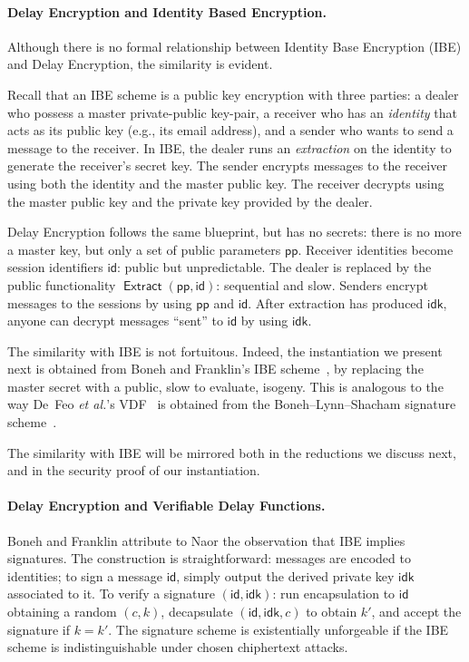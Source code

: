 \documentclass{llncs}
\DeclareMathOperator{\Extract}{\mathsf{Extract}}
\newcommand{\pp}{\mathsf{pp}}
\newcommand{\id}{\mathsf{id}}
\newcommand{\idk}{\mathsf{idk}}
\begin{document}
\paragraph{Delay Encryption and Identity Based Encryption.}
Although there is no formal relationship between Identity Base
Encryption (IBE) and Delay Encryption, the similarity is evident. 

Recall that an IBE scheme is a public key encryption with three
parties: a dealer who possess a master private-public key-pair, a
receiver who has an \emph{identity} that acts as its public key (e.g.,
its email address), and a sender who wants to send a message to the
receiver. %
In IBE, the dealer runs an \emph{extraction} on the identity to
generate the receiver's secret key. %
The sender encrypts messages to the receiver using both the identity
and the master public key. %
The receiver decrypts using the master public key and the private key
provided by the dealer.

Delay Encryption follows the same blueprint, but has no secrets: there
is no more a master key, but only a set of public parameters $\pp$. %
Receiver identities become session identifiers $\id$: public but
unpredictable. %
The dealer is replaced by the public functionality
$\Extract(\pp,\id)$: sequential and slow. %
Senders encrypt messages to the sessions by using $\pp$ and $\id$. %
After extraction has produced $\idk$, anyone can decrypt messages
``sent'' to $\id$ by using $\idk$.

The similarity with IBE is not fortuitous. %
Indeed, the instantiation we present next is obtained from Boneh and
Franklin's IBE scheme~\cite{doi:10.1137/S0097539701398521}, by
replacing the master secret with a public, slow to evaluate, isogeny.
This is analogous to the way De~Feo \emph{et al.}'s
VDF~\cite{10.1007/978-3-030-34578-5_10} is obtained from the
Boneh--Lynn--Shacham signature scheme~\cite{boneh+lynn+shacham04}.

The similarity with IBE will be mirrored both in the reductions we
discuss next, and in the security proof of our instantiation.

\paragraph{Delay Encryption and Verifiable Delay Functions.}
Boneh and Franklin attribute to Naor the observation that IBE implies
signatures. %
The construction is straightforward: messages are encoded to
identities; to sign a message $\id$, simply output the derived private
key $\idk$ associated to it. %
To verify a signature $(\id,\idk)$: run encapsulation to $\id$
obtaining a random $(c,k)$, decapsulate $(\id,\idk,c)$ to obtain $k'$,
and accept the signature if $k=k'$. %
The signature scheme is existentially unforgeable if the IBE scheme is
indistinguishable under chosen chiphertext attacks.
\end{document}
